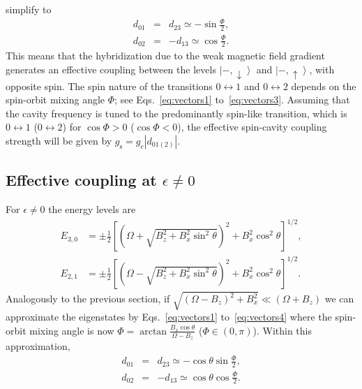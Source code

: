 \documentclass[twocolumn,english,aps,prl,preprint,reprint,showpacs,longbibliography,showkeys]{revtex4-1}
\begin{document}
simplify to
\begin{eqnarray}
d_{01}&=&d_{23}  \simeq -\sin\frac{\Phi}{2},\\
d_{02}&=&-d_{13}  \simeq \cos\frac{\Phi}{2}. \label{eq:delements}
\end{eqnarray}
This means that the hybridization due to the  weak magnetic field gradient generates an 
effective coupling between the levels $\left|-,\downarrow\right\rangle$ and $\left|-,\uparrow\right\rangle$, with opposite spin. 
The spin nature of the transitions $0\leftrightarrow 1$ and $0\leftrightarrow 2$ depends on the spin-orbit mixing angle $\Phi$; see Eqs.~\eqref{eq:vectors1} to~\eqref{eq:vectors3}. 
Assuming that the cavity frequency is tuned to the predominantly spin-like transition, 
which is $0\leftrightarrow1$ ($0\leftrightarrow2$) for $\cos\Phi>0$ ($\cos\Phi<0$), the effective spin-cavity coupling strength will be given by $g_{\mathrm{s}}=g_c|d_{01(2)}|$.



\subsection{Effective coupling at $\epsilon\neq 0$}
\label{subsec:coupling-epsno0}

For $\epsilon\neq 0$ the energy levels are
\begin{align}
E_{3,0}  &={\pm}\frac{1}{2}\left[\left(\Omega+\sqrt{B_z^2+B_x^2 \sin^2{\theta}}\right)^2{+}B_x^2\cos^2{\theta}\right]^{1/2} ,\\
E_{2,1}  &={\pm}\frac{1}{2}\left[\left(\Omega-\sqrt{B_z^2+B_x^2 \sin^2{\theta}}\right)^2{+}B_x^2\cos^2{\theta}\right]^{1/2} .\label{eq:energies-general}
\end{align}
Analogously to the previous section,
if
$\sqrt{(\Omega-B_z)^2+B_x^2}\ll (\Omega+B_z)$
we can approximate the eigenstates by Eqs.~\eqref{eq:vectors1} to~\eqref{eq:vectors4}
where the spin-orbit mixing angle is now $\Phi=\arctan{\frac{B_x \cos\theta}{\Omega-B_z}}$  ($\Phi\in (0,\pi)$).
Within this approximation,
\begin{eqnarray}
d_{01}&=&d_{23}  \simeq-\cos\theta\sin\frac{\Phi}{2}, \label{eq:delements2}\\
d_{02}&=&-d_{13}  \simeq \cos\theta\cos\frac{\Phi}{2}. \label{eq:delements3}
\end{eqnarray}


\end{document}
